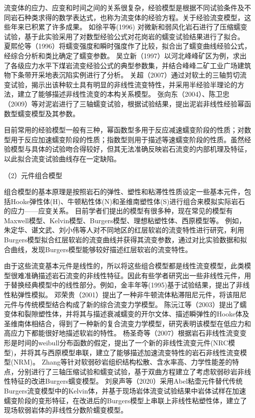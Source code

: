 流变体的应力、应变和时间之间的关系很复杂，经验模型是根据不同试验条件及不同岩石种类求得的数学表达式，也称为流变体的经验方程。关于经验流变模型，这些年来已积累了许多成果。
如徐平等(1996) 对微新和弱风化岩石进行了压缩蠕变试验，基于此实验采用了对数型经验公式对花岗岩的蠕变试验结果进行了拟合\cite{徐平1996}。
夏熙伦等（1996）将蠕变强度和瞬时强度作了比较，拟合出了蠕变曲线经验公式，经综合分析和类比确定了蠕变参数\cite{夏熙伦1996}。
吴立新（1997）以河北峰峰矿区为例，求出了各级应力水平下煤岩流变经验公式的典型参数集，并结合峰峰二矿工业广场建筑物下条带开采地表沉陷实例进行了分析\cite{吴立新1997}。
关超（2007）通过对软土的三轴剪切流变试验，揭示出该种软土具有明显的非线性流变特性，并采用半经验半理论的方法，建立了能够描述非线性流变的本构关系模型\cite{关超2007}。
张向东（2004）、陈卫忠（2009）等对泥岩进行了三轴蠕变试验，根据试验结果，提出泥岩非线性经验幂函数型蠕变模型及其参数\cite{张向东2004,陈卫忠2009}。

目前常用的经验模型一般有三种，幂函数型多用于反应减速蠕变阶段的性质；对数型用于反应加速蠕变阶段的性质；指数型则用于描述等速蠕变阶段的性质。虽然经验模型与具体的试验吻合得较好，但其无法准确反映岩石流变的内部机理及特征，以此拟合流变试验曲线存在一定缺陷。

（2）元件组合模型

组合模型的基本原理是按照岩石的弹性、塑性和粘滞性性质设定一些基本元件，包括Hooke弹性体(H)、牛顿粘性体(N)和圣维南塑性体(S)进行组合来模拟实际岩石的应力——应变关系。
目前学者们提出的模型有很多种，现在常见的模型有Maxwell模型、Kelvin模型、Burgers模型、理想粘塑性体、西原模型等。
例如，朱定华、谌文武、刘小伟等人对不同地区的红层软岩的流变特性进行研究，利用Burgers模型拟合红层软岩的流变曲线并获得其流变参数，通过对比实验数据和拟合曲线，发现Burgers模型能够较好描述红层软岩的流变特性\cite{朱定华2002,谌文武2009,刘小伟2010}。

由于这些流变基本元件是线性的，所以将这些组合模型都是线性流变模型，此类模型很难准确描述岩石流变的非线性特征。因此有些学者研究出一些非线性元件，用于替换经典模型中的线性部分。例如，金丰年等(1995)基于试验结果，提出了非线性粘弹性模拟\cite{金丰年1995}。
邓荣贵（2001）提出了一种非牛顿流体粘滞阻尼元件，将该阻尼元件与传统模型结合构成了新的综合流变力学模型\cite{邓荣贵2001}。 
陈沅江等（2003）提出了蠕变体和裂隙塑性体，并将其与描述衰减蠕变的开尔文体、描述瞬弹性的Hooke体及圣维南体相结合，得到了一种新的复合流变力学模型，研究表明该模型在低应力和高应力下都能很好地描述软岩的特性\cite{陈沅江2003_一种软岩流变模型}。
杨圣奇等（2007）根据岩石非线性流变变形是时间的weibull分布函数的假定，提出了一个新的非线性流变元件(NRC模型)，并将其与西原模型串联，建立了能够描述加速流变特性的岩石非线性流变模型(NRM)\cite{杨圣奇2007}。
Zhang等针对软弱砂岩组织结构松散、含水率高、力学性能差的特点，分别进行了三轴压缩试验和蠕变试验，基于双曲方程建立了考虑软弱砂岩非线性特征的改进Burgers蠕变模型\cite{Zhang2013}。
刘泉声等（2020）采用Abel粘壶元件替代传统Burgers流变模型中的Kelvin体，并基于现场岩体流变试验结果中岩体试样在加速蠕变阶段的变形特征，在改进后的Burgers模型上串联上非线性粘塑性体，建立了现场软弱岩体的非线性分数阶蠕变模型\cite{刘泉声2020}。

